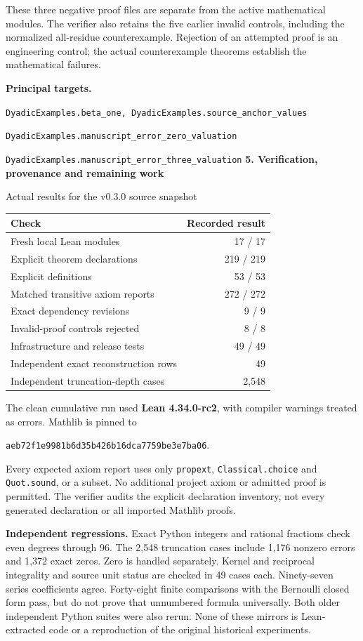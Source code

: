 \documentclass[11pt]{article}
\newcommand{\target}[1]{{\footnotesize\texttt{#1}}}
\newcommand{\pageheading}[2]{{\Large\bfseries\color{ink}#1}\par{\small #2}\par\medskip}
\begin{document}
These three negative proof files are separate from the active mathematical modules. The verifier also retains the five earlier invalid controls, including the normalized all-residue counterexample. Rejection of an attempted proof is an engineering control; the actual counterexample theorems establish the mathematical failures.

\textbf{Principal targets.}\par
\target{DyadicExamples.beta\_one, DyadicExamples.source\_anchor\_values}\par
\target{DyadicExamples.manuscript\_error\_zero\_valuation}\par
\target{DyadicExamples.manuscript\_error\_three\_valuation}
\newpage
\pageheading{5. Verification, provenance and remaining work}{Actual results for the v0.3.0 source snapshot}
\begin{center}
\begin{tabular}{@{}p{}r@{}}
\toprule
Check & Recorded result\\\midrule
Fresh local Lean modules & 17 / 17\\
Explicit theorem declarations & 219 / 219\\
Explicit definitions & 53 / 53\\
Matched transitive axiom reports & 272 / 272\\
Exact dependency revisions & 9 / 9\\
Invalid-proof controls rejected & 8 / 8\\
Infrastructure and release tests & 49 / 49\\
Independent exact reconstruction rows & 49\\
Independent truncation-depth cases & 2,548\\\bottomrule
\end{tabular}
\end{center}
The clean cumulative run used \textbf{Lean 4.34.0-rc2}, with compiler warnings treated as errors. Mathlib is pinned to
\begin{center}
\texttt{aeb72f1e9981b6d35b426b16dca7759be3e7ba06}.
\end{center}
Every expected axiom report uses only \texttt{propext}, \texttt{Classical.choice} and \texttt{Quot.sound}, or a subset. No additional project axiom or admitted proof is permitted. The verifier audits the explicit declaration inventory, not every generated declaration or all imported Mathlib proofs.

\textbf{Independent regressions.} Exact Python integers and rational fractions check even degrees through 96. The 2,548 truncation cases include 1,176 nonzero errors and 1,372 exact zeros. Zero is handled separately. Kernel and reciprocal integrality and source unit status are checked in 49 cases each. Ninety-seven series coefficients agree. Forty-eight finite comparisons with the Bernoulli closed form pass, but do not prove that unnumbered formula universally. Both older independent Python suites were also rerun. None of these mirrors is Lean-extracted code or a reproduction of the original historical experiments.
\end{document}
